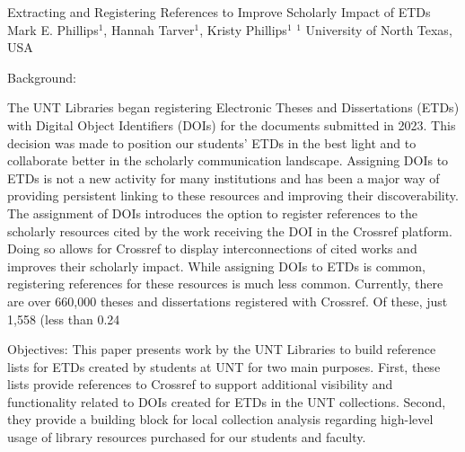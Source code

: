 
    \begin{abstract_online}{Extracting and Registering References to Improve Scholarly Impact of ETDs}{%
    Mark E. Phillips$^{1}$, Hannah Tarver$^{1}$, Kristy Phillips$^{1}$}{%
    }{%
    $^1$ University of North Texas, USA
}

Background:

The UNT Libraries began registering Electronic Theses and Dissertations (ETDs) with Digital Object Identifiers (DOIs) for the documents submitted in 2023. This decision was made to position our students’ ETDs in the best light and to collaborate better in the scholarly communication landscape. Assigning DOIs to ETDs is not a new activity for many institutions and has been a major way of providing persistent linking to these resources and improving their discoverability. The assignment of DOIs introduces the option to register references to the scholarly resources cited by the work receiving the DOI in the Crossref platform. Doing so allows for Crossref to display interconnections of cited works and improves their scholarly impact. While assigning DOIs to ETDs is common, registering references for these resources is much less common. Currently, there are over 660,000 theses and dissertations registered with Crossref. Of these, just 1,558 (less than 0.24%

Objectives: This paper presents work by the UNT Libraries to build reference lists for ETDs created by students at UNT for two main purposes. First, these lists provide references to Crossref to support additional visibility and functionality related to DOIs created for ETDs in the UNT collections. Second, they provide a building block for local collection analysis regarding high-level usage of library resources purchased for our students and faculty.


\end{abstract_online}
